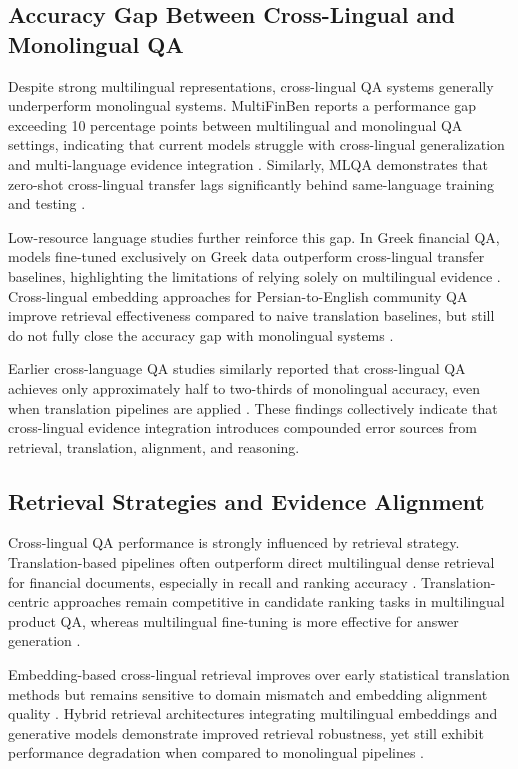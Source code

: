 \subsection{Accuracy Gap Between Cross-Lingual and Monolingual QA}

Despite strong multilingual representations, cross-lingual QA systems generally underperform monolingual systems. MultiFinBen reports a performance gap exceeding 10 percentage points between multilingual and monolingual QA settings, indicating that current models struggle with cross-lingual generalization and multi-language evidence integration \citep{peng2025multifinben}. Similarly, MLQA demonstrates that zero-shot cross-lingual transfer lags significantly behind same-language training and testing \citep{lewis2020mlqa}.

Low-resource language studies further reinforce this gap. In Greek financial QA, models fine-tuned exclusively on Greek data outperform cross-lingual transfer baselines, highlighting the limitations of relying solely on multilingual evidence \citep{peng2025plutus}. Cross-lingual embedding approaches for Persian-to-English community QA improve retrieval effectiveness compared to naive translation baselines, but still do not fully close the accuracy gap with monolingual systems \citep{haji2020crosslingual}.

Earlier cross-language QA studies similarly reported that cross-lingual QA achieves only approximately half to two-thirds of monolingual accuracy, even when translation pipelines are applied \citep{kwok2006chinese}. These findings collectively indicate that cross-lingual evidence integration introduces compounded error sources from retrieval, translation, alignment, and reasoning.

\subsection{Retrieval Strategies and Evidence Alignment}

Cross-lingual QA performance is strongly influenced by retrieval strategy. Translation-based pipelines often outperform direct multilingual dense retrieval for financial documents, especially in recall and ranking accuracy \citep{chiu2025translation}. Translation-centric approaches remain competitive in candidate ranking tasks in multilingual product QA, whereas multilingual fine-tuning is more effective for answer generation \citep{shen2023xpqa}.

Embedding-based cross-lingual retrieval improves over early statistical translation methods but remains sensitive to domain mismatch and embedding alignment quality \citep{goworek2025clir, hieber2015bow}. Hybrid retrieval architectures integrating multilingual embeddings and generative models demonstrate improved retrieval robustness, yet still exhibit performance degradation when compared to monolingual pipelines \citep{khetarpaul2024clorqa}.

